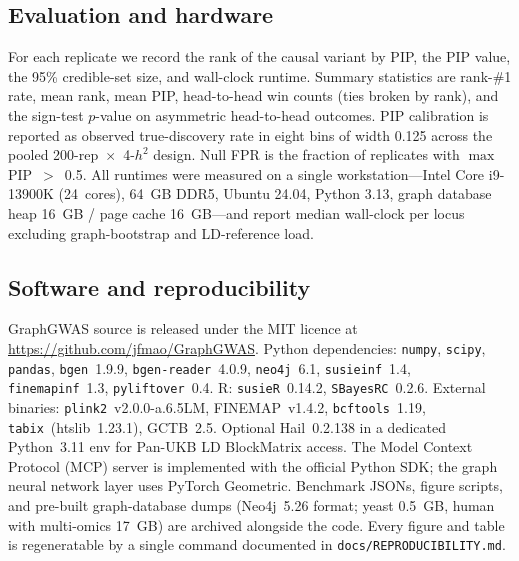 \subsection*{Evaluation and hardware}

For each replicate we record the rank of the causal variant by PIP,
the PIP value, the 95\% credible-set size, and wall-clock runtime.
Summary statistics are rank-\#1 rate, mean rank, mean PIP,
head-to-head win counts (ties broken by rank), and the sign-test
$p$-value on asymmetric head-to-head outcomes. PIP calibration is
reported as observed true-discovery rate in eight bins of width
0.125 across the pooled 200-rep~$\times$~4-$h^2$ design. Null FPR
is the fraction of replicates with $\max$\,PIP~$>$~0.5. All runtimes
were measured on a single workstation---Intel Core i9-13900K
(24~cores), 64~GB DDR5, Ubuntu 24.04, Python 3.13, graph database
heap 16~GB / page cache 16~GB---and report median wall-clock per locus
excluding graph-bootstrap and LD-reference load.

\subsection*{Software and reproducibility}

GraphGWAS source is released under the MIT licence at
\url{https://github.com/jfmao/GraphGWAS}. Python dependencies:
\texttt{numpy}\cite{harris2020numpy}, \texttt{scipy}\cite{virtanen2020scipy},
\texttt{pandas}, \texttt{bgen}~1.9.9, \texttt{bgen-reader}~4.0.9,
\texttt{neo4j}~6.1, \texttt{susieinf}~1.4, \texttt{finemapinf}~1.3,
\texttt{pyliftover}~0.4. R: \texttt{susieR}~0.14.2,
\texttt{SBayesRC}~0.2.6. External binaries:
\texttt{plink2}\cite{chang2015second}~v2.0.0-a.6.5LM, FINEMAP~v1.4.2,
\texttt{bcftools}\cite{danecek2021twelve}~1.19,
\texttt{tabix}\cite{li2011tabix}~(htslib~1.23.1), GCTB~2.5. Optional
Hail\cite{hailteam2024}~0.2.138 in a dedicated Python~3.11 env for
Pan-UKB LD BlockMatrix access. The Model Context Protocol (MCP)
server\cite{mcp2024} is implemented with the official Python SDK;
the graph neural network layer uses PyTorch
Geometric\cite{fey2019fast}.
Benchmark JSONs, figure scripts, and pre-built graph-database
dumps (Neo4j~5.26 format; yeast 0.5~GB, human with multi-omics
17~GB) are archived alongside the code. Every
figure and table is regeneratable by a single command documented in
\texttt{docs/REPRODUCIBILITY.md}.


